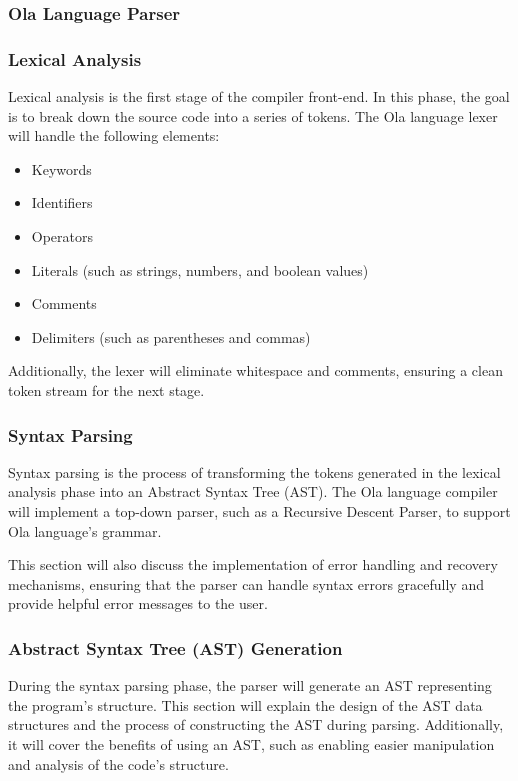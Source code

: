 
\subsubsection{Ola Language Parser}
\subsubsection*{Lexical Analysis}
Lexical analysis is the first stage of the compiler front-end. In this phase, the goal is to break down the source code into a series of tokens. The Ola language lexer will handle the following elements:
\begin{itemize}
\item Keywords
\item Identifiers
\item Operators
\item Literals (such as strings, numbers, and boolean values)
\item Comments
\item Delimiters (such as parentheses and commas)
\end{itemize}
Additionally, the lexer will eliminate whitespace and comments, ensuring a clean token stream for the next stage.

\subsubsection*{Syntax Parsing}
Syntax parsing is the process of transforming the tokens generated in the lexical analysis phase into an Abstract Syntax Tree (AST). The Ola language compiler will implement a top-down parser, such as a Recursive Descent Parser, to support Ola language's grammar.

This section will also discuss the implementation of error handling and recovery mechanisms, ensuring that the parser can handle syntax errors gracefully and provide helpful error messages to the user.

\subsubsection*{Abstract Syntax Tree (AST) Generation}
During the syntax parsing phase, the parser will generate an AST representing the program's structure. This section will explain the design of the AST data structures and the process of constructing the AST during parsing. Additionally, it will cover the benefits of using an AST, such as enabling easier manipulation and analysis of the code's structure.

